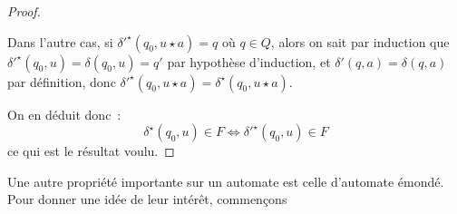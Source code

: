 \begin{proof}
\begin{itemize}
    Dans l'autre cas, si $\delta'^\star(q_0,u\star a) = q$ où $q \in Q$, alors
    on sait par induction que $\delta'^\star(q_0,u) = \delta(q_0,u) = q'$ par
    hypothèse d'induction, et $\delta'(q,a) = \delta(q,a)$ par définition,
    donc $\delta'^\star(q_0,u\star a) = \delta^\star(q_0,u\star a)$.
  \end{itemize}

  On en déduit donc~:
  \[\delta^\star(q_0,u) \in F \iff \delta'^\star(q_0,u)\in F\]
  ce qui est le résultat voulu.
\end{proof}

Une autre propriété importante sur un automate est celle d'automate émondé.
Pour donner une idée de leur intérêt, commençons
